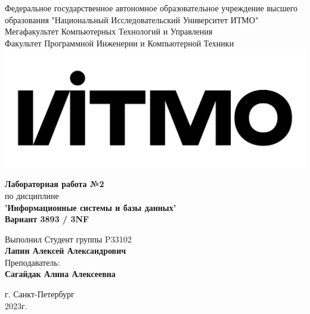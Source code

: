 \documentclass[12pt,onecolumn]{article}
\begin{document}
\setcounter{tocdepth}{4}
\begin{center}
    Федеральное государственное автономное образовательное учреждение высшего образования "Национальный Исследовательский Университет ИТМО"\\ 
    Мегафакультет Компьютерных Технологий и Управления\\
    Факультет Программной Инженерии и Компьютерной Техники \\
    \includegraphics[scale=0.3]{image/itmo.jpg} %
\end{center}
\vspace{1cm}


\begin{center}
    \textbf{Лабораторная работа №2}\\
    по дисциплине\\
    \textbf{'Информационные системы и базы данных'}\\
    \textbf{Вариант 3893 / 3NF}
\end{center}

\vspace{2cm}

\begin{flushright}
  Выполнил Студент  группы P33102\\
  \textbf{Лапин Алексей Александрович}\\
  Преподаватель: \\
  \textbf{Сагайдак Алина Алексеевна}\\
\end{flushright}

\vspace{6cm}
\begin{center}
    г. Санкт-Петербург\\
    2023г.
\end{center}

\newpage
\tableofcontents
\newpage
\end{document}
